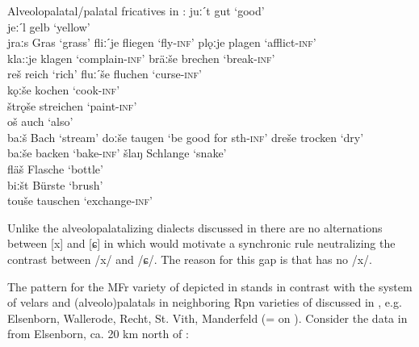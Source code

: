 \ea%
\label{ex:14:41}Alveolopalatal/palatal fricatives in :
\ea\label{ex:14:41a} juːˊt \tab [ʝuːt] \tab gut \tab ‘good’ \\
    jeːˊl \tab [ʝeːl] \tab gelb \tab ‘yellow’ \\
    jraːs \tab [ʝrɑːs] \tab Gras \tab ‘grass’ 
\ex\label{ex:14:41b} fliːˊje \tab [fliːʝə] \tab fliegen \tab ‘fly\textsc{{}-inf}’ 
\ex\label{ex:14:41c} plǫːje \tab [plɔːʝə] \tab plagen \tab ‘afflict\textsc{{}-inf}’ \\
    kla:ːje \tab [klɑːʝə] \tab klagen \tab ‘complain-\textsc{inf}’ 
\ex\label{ex:14:41d} bräːše \tab [bræːɕə] \tab brechen \tab ‘break\textsc{{}-inf}’ \\
    reš \tab [reɕ] \tab reich \tab ‘rich’ 
\ex\label{ex:14:41e} fluːˊše \tab [fluɕə] \tab fluchen \tab ‘curse\textsc{{}-inf}’ \\
    kǫːše \tab [kɔɕə] \tab kochen \tab ‘cook\textsc{{}-inf}’ \\
    štrǫše \tab [ɕtrɔɕə] \tab streichen \tab ‘paint\textsc{{}-inf}’ \\
    oš \tab [oɕ] \tab auch \tab ‘also’ \\
    baːš \tab [bɑːɕ] \tab Bach \tab ‘stream’ 
\ex\label{ex:14:41f} doːše \tab [doːɕə] \tab taugen \tab ‘be good for sth-\textsc{inf}’ 
\ex\label{ex:14:41g} dreše \tab [dreɕə] \tab trocken \tab ‘dry’ \\
    baːše \tab [bɑːɕə] \tab backen \tab ‘bake-\textsc{inf}’ 
\ex\label{ex:14:41h} šlaŋ \tab [ɕlɑŋ] \tab Schlange \tab ‘snake’ \\
    fläš \tab [flæɕ] \tab Flasche \tab ‘bottle’ \\
    biːšt \tab [biːɕt] \tab Bürste \tab ‘brush’ \\
    touše \tab [touɕə] \tab tauschen \tab ‘exchange-\textsc{inf}’ 
\z 
\z{}

Unlike the alveolopalatalizing dialects discussed in  there are no alternations between [x] and [ɕ] in  which would motivate a synchronic rule neutralizing the contrast between /x/ and /ɕ/. The reason for this gap is that  has no /x/.

The pattern for the MFr variety of  depicted in  stands in contrast with the system of velars and (alveolo)palatals in neighboring Rpn varieties of  discussed in \citet{Hecker1972}, e.g. Elsenborn, Wallerode, Recht, St. Vith, Manderfeld (=\citealt{Hecker1972} on ). Consider the data in  from Elsenborn, ca. 20 km north of :

